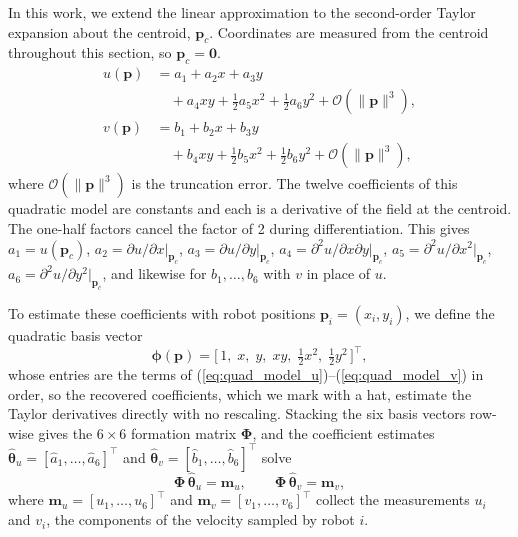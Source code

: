 \documentclass[lettersize,journal]{IEEEtran}
\begin{document}
In this work, we extend the linear approximation to the second-order Taylor expansion about the
centroid, $\mathbf{p}_c$. Coordinates are measured
from the centroid throughout this section, so $\mathbf{p}_c = \mathbf{0}$.
\begin{align}
    u(\mathbf{p}) &= a_1 + a_2 x + a_3 y
        \nonumber \\
        &\quad + a_4 xy + \tfrac{1}{2} a_5 x^2 + \tfrac{1}{2} a_6 y^2
        + \mathcal{O}(\|\mathbf{p}\|^3),
        \label{eq:quad_model_u} \\
    v(\mathbf{p}) &= b_1 + b_2 x + b_3 y
        \nonumber \\
        &\quad + b_4 xy + \tfrac{1}{2} b_5 x^2 + \tfrac{1}{2} b_6 y^2
        + \mathcal{O}(\|\mathbf{p}\|^3),
        \label{eq:quad_model_v}
\end{align}
where $\mathcal{O}(\|\mathbf{p}\|^3)$ is the truncation error.
The twelve coefficients of this quadratic model are constants and each is a derivative of the field at
the centroid. The one-half factors cancel the factor of 2 during differentiation.
This gives $a_1 = u(\mathbf{p}_c)$, $a_2 = \partial u/\partial
x|_{\mathbf{p}_c}$, $a_3 = \partial u/\partial y|_{\mathbf{p}_c}$,
$a_4 = \partial^2 u/\partial x \partial
y|_{\mathbf{p}_c}$, $a_5 = \partial^2 u/\partial x^2|_{\mathbf{p}_c}$,
$a_6 = \partial^2 u/\partial y^2|_{\mathbf{p}_c}$,
and likewise for $b_1, \ldots, b_6$ with $v$ in place of $u$.

To estimate these coefficients with robot positions $\mathbf{p}_i = (x_i,
y_i)$, we define the quadratic basis vector
\begin{equation}
    \boldsymbol{\phi}(\mathbf{p}) =
    \bigl[\,1, \; x, \; y, \; xy, \;
    \tfrac{1}{2}x^2, \; \tfrac{1}{2}y^2\,\bigr]^\top,
\end{equation}
whose entries are the terms of
(\ref{eq:quad_model_u})--(\ref{eq:quad_model_v}) in order, so
the recovered coefficients, which we mark with a hat, estimate the Taylor derivatives directly with
no rescaling. Stacking the six basis vectors row-wise gives
the $6 \times 6$ formation matrix $\boldsymbol{\Phi}$, and the coefficient
estimates $\hat{\boldsymbol{\theta}}_u = [\hat{a}_1, \ldots,
\hat{a}_6]^\top$ and $\hat{\boldsymbol{\theta}}_v = [\hat{b}_1, \ldots,
\hat{b}_6]^\top$ solve
\begin{equation}
    \boldsymbol{\Phi}\,\hat{\boldsymbol{\theta}}_u = \mathbf{m}_u, \qquad
    \boldsymbol{\Phi}\,\hat{\boldsymbol{\theta}}_v = \mathbf{m}_v,
    \label{eq:solve}
\end{equation}
where $\mathbf{m}_u = [u_1, \ldots, u_6]^\top$ and
$\mathbf{m}_v = [v_1, \ldots, v_6]^\top$ collect the measurements $u_i$ and $v_i$, the components of the velocity
sampled by robot $i$. 
\end{document}
